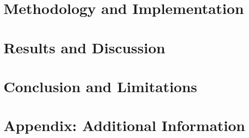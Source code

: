 \documentclass[12pt, a4paper]{report}
\begin{document}
\chapter{Methodology and Implementation}

\chapter{Results and Discussion}


\chapter{Conclusion and Limitations}


\setmainlanguage{english}
\printbibliography[title={References Bibliography}]

\appendix
\setmainlanguage{english}

\chapter{Appendix: Additional Information}

\end{document}
